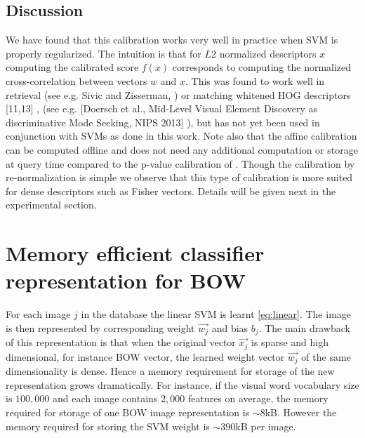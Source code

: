   \subsection{Discussion}
      We have found that this calibration works very well in practice when SVM is properly regularized.
      The intuition is that for $L2$ normalized descriptors $x$ computing the calibrated score $f(x)$ corresponds to computing the normalized cross-correlation between vectors $w$ and $x$. This was found to work well in retrieval (see e.g. Sivic and Zisserman, \cite{}) or matching whitened HOG descriptors [11,13] \cite{}, \cite{} (see e.g. [Doersch et al., Mid-Level Visual Element Discovery as discriminative Mode Seeking, NIPS 2013] \cite{}), but has not yet been used in conjunction with SVMs as done in this work. Note also that the affine calibration can be computed offline and does not need any additional computation or storage at query time compared to the p-value calibration of \cite{Gronat13}.
      Though the calibration by re-normalization is simple we observe that this type of calibration is more suited for dense descriptors such as Fisher vectors. Details will be given next in the experimental section. 


  \section{Memory efficient classifier representation for BOW}
  \label{sec:memory}
      For each image $j$ in the database the linear SVM is learnt \eqref{eq:linear}. The image is then represented by corresponding weight $\vec{w_j}$ and bias $b_j$. The main drawback of this representation is that when the original vector $\vec{x_j}$ is sparse and high dimensional, for instance BOW vector, the learned weight vector $\vec{w_j}$ of the same dimensionality is dense. Hence a memory requirement for storage of the new representation grows dramatically. For instance, if the visual word vocabulary size is $100,000$ and each image contains $2,000$ features on average, the memory required for storage of one BOW image representation is $\sim 8$kB. However the memory required for storing the SVM weight is $\sim390$kB per image.


